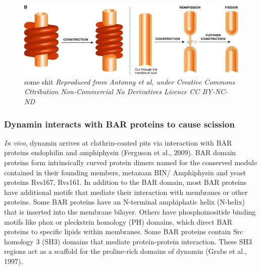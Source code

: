 		
	\begin{figure}[H]
			\centering
			\includegraphics[scale=0.5]{figures/intro/dynamin_2}
\caption[Dynamin forms a scaffold]
					{some shit
					\textit{Reproduced from Antonny et al, under Creative Commons Cttribution Non-Commercial No Derivatives Licence CC BY-NC-ND}
		\label{intro_dynamin_scission}}
		\end{figure}



		\subsubsection{Dynamin interacts with BAR proteins to cause scission}
\textit{In vivo}, dynamin arrives at clathrin-coated pits via interaction with BAR proteins endophilin and amphiphysin (Ferguson et al., 2009). BAR domain proteins form intrinsically curved protein dimers named for the conserved module contained in their founding members, metazoan BIN/ Amphiphysin and yeast proteins Rvs167, Rvs161. In addition to the BAR domain, most BAR proteins have additional motifs that mediate their interaction with membranes or other proteins. Some BAR proteins have an N-terminal amphiphatic helix (N-helix) that is inserted into the membrane bilayer.  Others have phosphoinositide binding motifs like phox or pleckstrin homology (PH) domains, which direct BAR proteins to specific lipids within membranes. Some BAR proteins contain Src homology 3 (SH3) domains that mediate protein-protein interaction. These SH3 regions act as a scaffold for the proline-rich domains of dynamin (Grabs et al., 1997). 



